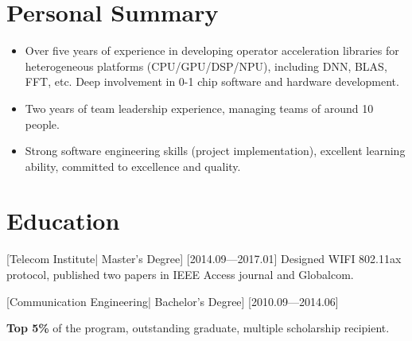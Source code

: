 \documentclass{resume}
\begin{document}


\ResumeTitle


\section{Personal Summary}

\begin{itemize}
  \item Over five years of experience in developing operator acceleration libraries for heterogeneous platforms (CPU/GPU/DSP/NPU), including DNN, BLAS, FFT, etc. Deep involvement in 0-1 chip software and hardware development.
  \item Two years of team leadership experience, managing teams of around 10 people.
  \item Strong software engineering skills (project implementation), excellent learning ability, committed to excellence and quality.
\end{itemize}

\section{Education}
[\textnormal{Telecom Institute|} Master's Degree]
[2014.09—2017.01]
Designed WIFI 802.11ax protocol, published two papers in IEEE Access journal and Globalcom.

\nocite{*} %
\printbibliography[heading={none}]



[\textnormal{Communication Engineering|} Bachelor's Degree]
[2010.09—2014.06]

\textbf{Top 5\%} of the program, outstanding graduate, multiple scholarship recipient.

\end{document}
